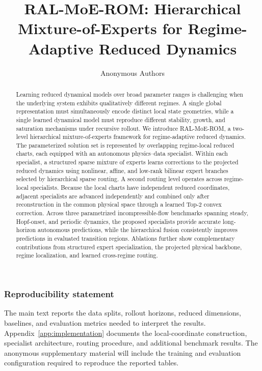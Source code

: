 \documentclass{article}
\title{RAL-MoE-ROM: Hierarchical Mixture-of-Experts for Regime-Adaptive Reduced Dynamics}
\author{Anonymous Authors}
\begin{document}
\maketitle

\begin{abstract}
Learning reduced dynamical models over broad parameter ranges is challenging when the underlying system exhibits qualitatively different regimes. A single global representation must simultaneously encode distinct local state geometries, while a single learned dynamical model must reproduce different stability, growth, and saturation mechanisms under recursive rollout. We introduce RAL-MoE-ROM, a two-level hierarchical mixture-of-experts framework for regime-adaptive reduced dynamics. The parameterized solution set is represented by overlapping regime-local reduced charts, each equipped with an autonomous physics--data specialist. Within each specialist, a structured sparse mixture of experts learns corrections to the projected reduced dynamics using nonlinear, affine, and low-rank bilinear expert branches selected by hierarchical sparse routing. A second routing level operates across regime-local specialists. Because the local charts have independent reduced coordinates, adjacent specialists are advanced independently and combined only after reconstruction in the common physical space through a learned Top-2 convex correction. Across three parametrized incompressible-flow benchmarks spanning steady, Hopf-onset, and periodic dynamics, the proposed specialists provide accurate long-horizon autonomous predictions, while the hierarchical fusion consistently improves predictions in evaluated transition regions. Ablations further show complementary contributions from structured expert specialization, the projected physical backbone, regime localization, and learned cross-regime routing.
\end{abstract}








\subsubsection*{Reproducibility statement}
The main text reports the data splits, rollout horizons, reduced dimensions, baselines, and evaluation metrics needed to interpret the results. Appendix~\ref{app:implementation} documents the local-coordinate construction, specialist architecture, routing procedure, and additional benchmark results. The anonymous supplementary material will include the training and evaluation configuration required to reproduce the reported tables.
\end{document}
